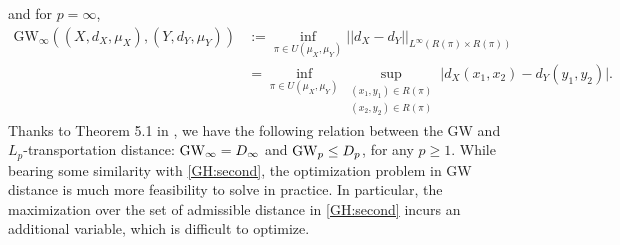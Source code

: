 and for $p = \infty$,
\begin{equation}
  \begin{split}
    \text{GW}_{\infty}((X, d_X, \mu_X), (Y, d_Y, \mu_Y)) &:=
    \inf_{ \pi \in U(\mu_X, \mu_Y)} || d_X - d_Y ||_{L^{\infty}(R(\pi) \times R(\pi))} \\
    &= \inf_{ \pi \in U(\mu_X, \mu_Y)}
    \sup_{\substack{(x_1,y_1) \in R(\pi) \\ (x_2,y_2) \in R(\pi)}} \big| d_X(x_1, x_2) - d_Y(y_1, y_2) \big|.
  \end{split}
\end{equation}
Thanks to Theorem 5.1 in \citep{Memoli11b},
we have the following relation between the GW and $L_p$-transportation distance:
$\text{GW}_{\infty} = D_{\infty}$ and $\text{GW}_p \leq D_p$, for any $p \geq 1$.
While bearing some similarity with \eqref{GH:second}, the optimization problem in GW distance is
much more feasibility to solve in practice. In particular, the maximization over
the set of admissible distance in \eqref{GH:second} incurs an additional variable,
which is difficult to optimize.

